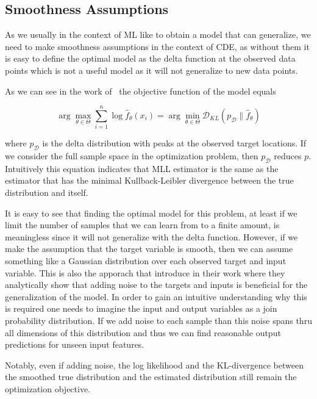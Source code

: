 \subsection{Smoothness Assumptions}\label{sec:smoothness}
As we usually in the context of ML like to obtain a model that can generalize, we need to make smoothness assumptions in the context of CDE, as without them it is easy to define the optimal model as the delta function at the observed data points which is not a useful model as it will not generalize to new data points.

As we can see in the work of~\cite{rothfuss2019noise} the objective function of the model equals

\begin{equation}
    \arg \max _{\theta \in \Theta} \sum_{i=1}^n \log
    \hat{f}_\theta\left(x_i\right)=\arg \min _{\theta \in \Theta}
    \mathcal{D}_{K
        L}\left(p_{\mathcal{D}} \| \hat{f}_\theta\right)
    \label{eq:kl_divergence_mll}
\end{equation}

where $p_{\mathcal{D}}$ is the delta distribution with peaks at the observed target locations. If we consider the full sample space in the optimization problem, then $p_{\mathcal{D}}$ reduces $p$. Intuitively this equation indicates that MLL estimator is the same as the estimator that has the minimal Kullback-Leibler divergence between the true distribution and itself.

It is easy to see that finding the optimal model for this problem, at least if we limit the number of samples that we can learn from to a finite amount, is meaningless since it will not generalize with the delta function. However, if we make the assumption that the target variable is smooth, then we can assume something like a Gaussian distribution over each observed target and input variable. This is also the apporach that \cite{rothfuss2019noise} introduce in their work where they analytically show that adding noise to the targets and inputs is beneficial for the generalization of the model. In order to gain an intuitive understanding why this is required one needs to imagine the input and output variables as a join probability distribution. If we add noise to each sample than this noise spans thru all dimensions of this distribution and thus we can find reasonable output predictions for unseen input features. %

Notably, even if adding noise, the log likelihood and the KL-divergence between the smoothed true distribution and the estimated distribution still remain the optimization objective. 

